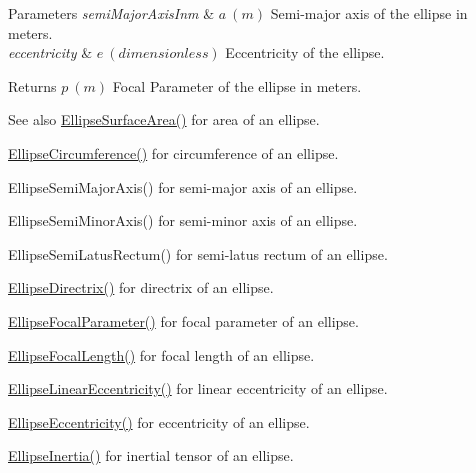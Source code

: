 \begin{DoxyParams}{Parameters}
{\em semi\+Major\+Axis\+Inm} & $ a\ (m)$ Semi-\/major axis of the ellipse in meters. \\
\hline
{\em eccentricity} & $ e\ (dimensionless)$ Eccentricity of the ellipse. \\
\hline
\end{DoxyParams}
\begin{DoxyReturn}{Returns}
$ p\ (m)$ Focal Parameter of the ellipse in meters. 
\end{DoxyReturn}
\begin{DoxySeeAlso}{See also}
\mbox{\hyperlink{group___e_g_x_math-_geometry-2_d-_ellipse-_surface_area_ga4ce8c8323e9718ce5458f4ab7f6d823d}{Ellipse\+Surface\+Area()}} for area of an ellipse. 

\mbox{\hyperlink{group___e_g_x_math-_geometry-2_d-_ellipse-_circumference_ga4172802ac674eb53467b44928ac635c7}{Ellipse\+Circumference()}} for circumference of an ellipse. 

Ellipse\+Semi\+Major\+Axis() for semi-\/major axis of an ellipse. 

Ellipse\+Semi\+Minor\+Axis() for semi-\/minor axis of an ellipse. 

Ellipse\+Semi\+Latus\+Rectum() for semi-\/latus rectum of an ellipse. 

\mbox{\hyperlink{group___e_g_x_math-_geometry-2_d-_ellipse-_directrix_gace8f72a8efbc9c18d3eb689151405106}{Ellipse\+Directrix()}} for directrix of an ellipse. 

\mbox{\hyperlink{group___e_g_x_math-_geometry-2_d-_ellipse-_focal_parameter_ga4cd01a38c72c092ef9791351948bf69b}{Ellipse\+Focal\+Parameter()}} for focal parameter of an ellipse. 

\mbox{\hyperlink{group___e_g_x_math-_geometry-2_d-_ellipse-_focal_length_gab8d63de7640c880cfecaeada6f2afdac}{Ellipse\+Focal\+Length()}} for focal length of an ellipse. 

\mbox{\hyperlink{group___e_g_x_math-_geometry-2_d-_ellipse-_linear_eccentricity_gac70b3010e30aa8b73deb50fe2b9b9a91}{Ellipse\+Linear\+Eccentricity()}} for linear eccentricity of an ellipse. 

\mbox{\hyperlink{group___e_g_x_math-_geometry-2_d-_ellipse-_eccentricity_ga6a0a7fba17f782616894cfc447628c33}{Ellipse\+Eccentricity()}} for eccentricity of an ellipse. 

\mbox{\hyperlink{group___e_g_x_math-_geometry-2_d-_ellipse-_inertia_ga10a3049c2f04b50f271fb01dc62e4cf8}{Ellipse\+Inertia()}} for inertial tensor of an ellipse. 
\end{DoxySeeAlso}
\mbox{\label{group___e_g_x_math-_geometry-2_d-_ellipse-_focal_parameter_ga61d3b31a8a32b43634b2ea89a83bc6a5}} 
